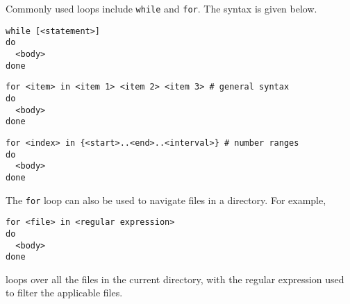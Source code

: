 Commonly used loops include \verb|while| and \verb|for|. The syntax is given below.

\begin{lstlisting}
while [<statement>]
do
  <body>
done
\end{lstlisting}

\begin{lstlisting}
for <item> in <item 1> <item 2> <item 3> # general syntax
do
  <body>
done
\end{lstlisting}

\begin{lstlisting}
for <index> in {<start>..<end>..<interval>} # number ranges
do
  <body>
done
\end{lstlisting}

The \verb|for| loop can also be used to navigate files in a directory. For example,
\begin{lstlisting}
for <file> in <regular expression>
do
  <body>
done
\end{lstlisting}
loops over all the files in the current directory, with the regular expression used to filter the applicable files.



















